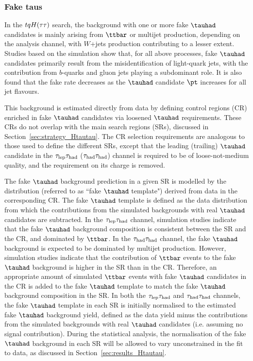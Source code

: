 \subsubsection{Fake taus}
\label{sec:faketaus}
In the $tqH(\tau\tau)$ search, the background with one or more fake $\tauhad$ candidates is mainly arising from $\ttbar$ or
multijet production, depending on the analysis channel, with $W$+jets production contributing to a lesser extent. 
Studies based on the simulation show that, for all above processes, fake $\tauhad$ candidates primarily result from the 
misidentification of light-quark jets, with the contribution from $b$-quarks and gluon jets playing a subdominant role.
It is also found that the fake rate decreases as the $\tauhad$ candidate $\pt$ increases for all jet flavours.

This background is estimated directly from data by defining control regions (CR) enriched in fake $\tauhad$ candidates via loosened $\tauhad$ requirements. These CRs do not overlap with the main search regions (SRs), discussed in Section~\ref{sec:strategy_Htautau}. The CR selection requirements are analogous to those used to define the different SRs, except that the leading (trailing) $\tauhad$ candidate 
in the $\tau_{\mathrm{lep}} \tau_{\mathrm{had}}$ ($\tau_{\mathrm{had}} \tau_{\mathrm{had}}$) channel is required to be of loose-not-medium quality, and the requirement on its charge is removed.

The fake $\tauhad$ background prediction in a given SR is modelled by the distribution (referred to as ``fake $\tauhad$ template") derived from data in the corresponding CR. The fake $\tauhad$ template is defined as the data distribution from which the contributions from the simulated backgrounds with real $\tauhad$ candidates are subtracted. In the $\tau_{\mathrm{lep}} \tau_{\mathrm{had}}$ channel, simulation studies indicate that the fake $\tauhad$ background composition is consistent between the SR and the CR, and dominated by $\ttbar$. In the $\tau_{\mathrm{had}} \tau_{\mathrm{had}}$ channel, the fake $\tauhad$ background is expected to be dominated by multijet production. However, simulation studies indicate that the contribution of $\ttbar$ events to the fake $\tauhad$ background is higher in the SR than in the CR. Therefore, an appropriate amount of simulated $\ttbar$ events with fake $\tauhad$ candidates in the CR is added to the fake $\tauhad$ template to match the fake $\tauhad$ background composition in the SR. 
In both the $\tau_{\mathrm{lep}} \tau_{\mathrm{had}}$ and $\tau_{\mathrm{had}} \tau_{\mathrm{had}}$ channels, the fake $\tauhad$ template in each SR is initially normalised to the estimated fake $\tauhad$ background yield, 
defined as the data yield minus the contributions from the simulated backgrounds with real $\tauhad$ candidates (i.e. assuming no signal contribution).
During the statistical analysis, the normalisation of the fake $\tauhad$ background in each SR will be allowed to vary unconstrained in the fit to data, as discussed in Section~\ref{sec:results_Htautau}.

